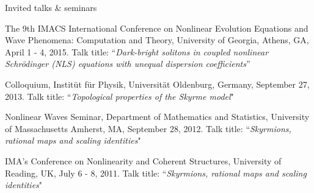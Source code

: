 \documentclass[10pt]{article} %
\begin{document}
\begin{section}{Invited talks \& seminars}
\begin{etaremune}
\item   The 9th IMACS International Conference on Nonlinear Evolution Equations and Wave Phenomena: Computation and Theory, %
        University of Georgia, Athens, GA, April 1 - 4, 2015. Talk title: %
        ``\textit{Dark-bright solitons in coupled nonlinear Schr\"odinger (NLS) equations with unequal dispersion coefficients}''      
   
\item   Colloquium, Instit\"ut f\"ur Physik, Universit\"at Oldenburg, Germany, September 27, 2013. Talk title: 
        ``\textit{Topological properties of the Skyrme model}"
  
\item   Nonlinear Waves Seminar, Department of Mathematics and Statistics, University of Massachusetts Amherst, MA, September 28, 2012.
        Talk title: ``\textit{Skyrmions, rational maps and scaling identities}"
   
\item   IMA's Conference on Nonlinearity and Coherent Structures, University of Reading, UK, July 6 - 8, 2011.
        Talk title: ``\textit{Skyrmions, rational maps and scaling identities}"

\end{etaremune}
\end{section}
\end{document}

